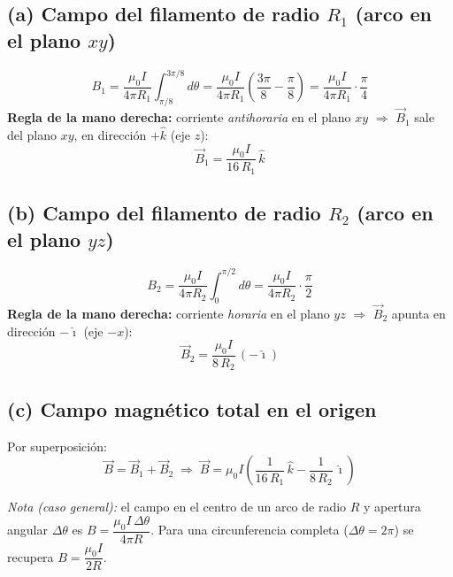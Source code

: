 \documentclass[12pt,letterpaper]{article}
\begin{document}
\subsection*{(a) Campo del filamento de radio $R_1$ (arco en el plano $xy$)}
\[
    B_1 = \frac{\mu_0 I}{4\pi R_1}\int_{\pi/8}^{3\pi/8} d\theta
        = \frac{\mu_0 I}{4\pi R_1}\left(\frac{3\pi}{8}-\frac{\pi}{8}\right)
        = \frac{\mu_0 I}{4\pi R_1}\cdot\frac{\pi}{4}
\]
\textbf{Regla de la mano derecha:} corriente \emph{antihoraria} en el plano $xy$ $\Rightarrow$
$\vec{B}_1$ sale del plano $xy$, en direcci\'on $+\hat{k}$ (eje $z$):
\[
    \boxed{\vec{B}_1 = \frac{\mu_0 I}{16\,R_1}\,\hat{k}}
\]

\subsection*{(b) Campo del filamento de radio $R_2$ (arco en el plano $yz$)}
\[
    B_2 = \frac{\mu_0 I}{4\pi R_2}\int_{0}^{\pi/2} d\theta
        = \frac{\mu_0 I}{4\pi R_2}\cdot\frac{\pi}{2}
\]
\textbf{Regla de la mano derecha:} corriente \emph{horaria} en el plano $yz$ $\Rightarrow$
$\vec{B}_2$ apunta en direcci\'on $-\hat{\imath}$ (eje $-x$):
\[
    \boxed{\vec{B}_2 = \frac{\mu_0 I}{8\,R_2}\,(-\hat{\imath})}
\]

\subsection*{(c) Campo magn\'etico total en el origen}
Por superposici\'on:
\[
    \vec{B} = \vec{B}_1 + \vec{B}_2
    \;\Rightarrow\;
    \boxed{\vec{B} = \mu_0 I\left(\frac{1}{16\,R_1}\,\hat{k} - \frac{1}{8\,R_2}\,\hat{\imath}\right)}
\]

\vspace{0.3cm}

\noindent\small\textit{Nota (caso general):} el campo en el centro de un arco de radio $R$ y
apertura angular $\Delta\theta$ es $B = \dfrac{\mu_0 I\,\Delta\theta}{4\pi R}$. Para una
circunferencia completa ($\Delta\theta = 2\pi$) se recupera $B = \dfrac{\mu_0 I}{2R}$.\normalsize
\end{document}
